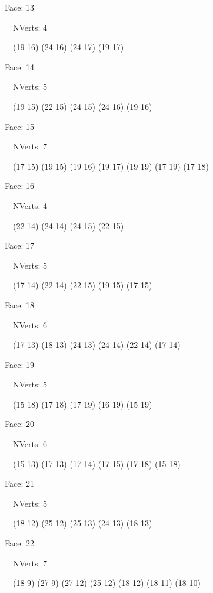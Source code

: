\documentclass{article}
\begin{document}
{\footnotesize 

Face: 13

\   \    NVerts: 4

 \   \   (19 16) (24 16) (24 17) (19 17)}

{\footnotesize 

Face: 14

\   \    NVerts: 5

 \   \   (19 15) (22 15) (24 15) (24 16) (19 16)}

{\footnotesize 

Face: 15

\   \    NVerts: 7

 \   \   (17 15) (19 15) (19 16) (19 17) (19 19) (17 19) (17 18)}

{\footnotesize 

Face: 16

\   \    NVerts: 4

 \   \   (22 14) (24 14) (24 15) (22 15)}

{\footnotesize 

Face: 17

\   \    NVerts: 5

 \   \   (17 14) (22 14) (22 15) (19 15) (17 15)}

{\footnotesize 

Face: 18

\   \    NVerts: 6

 \   \   (17 13) (18 13) (24 13) (24 14) (22 14) (17 14)}

{\footnotesize 

Face: 19

\   \    NVerts: 5

 \   \   (15 18) (17 18) (17 19) (16 19) (15 19)}

{\footnotesize 

Face: 20

\   \    NVerts: 6

 \   \   (15 13) (17 13) (17 14) (17 15) (17 18) (15 18)}

{\footnotesize 

Face: 21

\   \    NVerts: 5

 \   \   (18 12) (25 12) (25 13) (24 13) (18 13)}

{\footnotesize 

Face: 22

\   \    NVerts: 7

 \   \   (18 9) (27 9) (27 12) (25 12) (18 12) (18 11) (18 10)}
\end{document}
